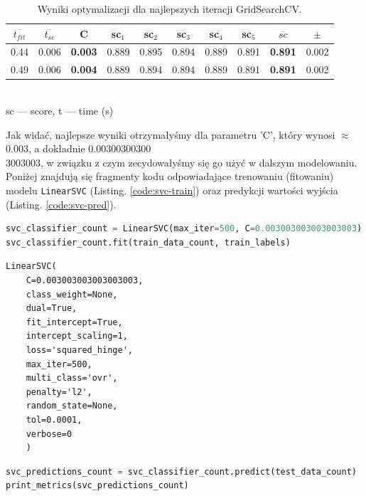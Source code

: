 \bigskip
\begin{table} [H]
	\caption{Wyniki optymalizacji dla najlepszych iteracji GridSearchCV.}
	\begin{center}
		\begin{tabular}{c  c || c || c  c  c  c  c  || c  || c }
			\hline
			$\overline{t_{fit}}$&$\overline{t_{sc}}$ &\textbf{C} &	sc$_1$&	sc$_2$ &sc$_3$ &	sc$_4$ &	sc$_5$	& \textbf{$\overline{sc}$ }&	$\pm$	\\
			\hline
			0.44&	0.006&	\textbf{0.003}&	0.889 &	0.895 &	0.894 &	0.889&	0.891&	\textbf{0.891}&	0.002 \\
			0.49&	0.006&	\textbf{0.004}&	0.889 &	0.894 &	0.894 &	0.889&	0.891&	\textbf{0.891}&	0.002 \\
			\hline
		\end{tabular} \\
		{\scriptsize sc --- score, t --- time (s)}
	\end{center}
\end{table}

\noindent Jak widać, najlepsze wyniki otrzymałyśmy dla parametru 'C', który wynosi $\approx$0.003, a dokładnie 0.00300300300\\3003003, w związku z czym zecydowałyśmy się go użyć w dalszym modelowaniu.
Poniżej znajdują się fragmenty kodu odpowiadające trenowaniu (fitowaniu) modelu \verb|LinearSVC| (Listing. \ref{code:svc-train}) oraz predykcji wartości wyjścia (Listing. \ref{code:svc-pred}).

\bigskip

\begin{lstlisting}[language=Python,frame=single, breaklines=true, caption=Trening SVM dla C 0.003003003003003003.,label=code:svc-train]
svc_classifier_count = LinearSVC(max_iter=500, C=0.003003003003003003)
svc_classifier_count.fit(train_data_count, train_labels)
\end{lstlisting}

\bigskip
\begin{Verbatim}
LinearSVC(
	C=0.003003003003003003,
	class_weight=None,
	dual=True,
	fit_intercept=True, 
	intercept_scaling=1,
	loss='squared_hinge', 
	max_iter=500, 
	multi_class='ovr', 
	penalty='l2', 
	random_state=None, 
	tol=0.0001, 
	verbose=0
	)
\end{Verbatim}

\bigskip
\begin{lstlisting}[language=Python,frame=single, breaklines=true, caption=Predykcja SVM dla C 0.003003003003003003.,label=code:svc-pred]
svc_predictions_count = svc_classifier_count.predict(test_data_count)
print_metrics(svc_predictions_count)
\end{lstlisting}

